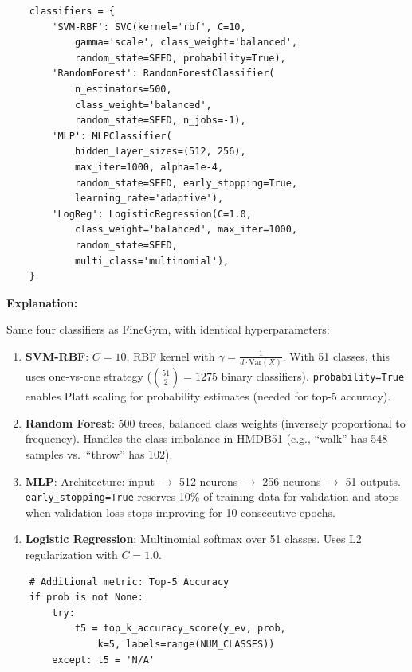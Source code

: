 \documentclass[a4paper, 12pt]{article}
\newenvironment{explanation}{%
  \par\smallskip
  \noindent\textcolor{blue!70!black}{\textbf{Explanation:}}\\
  \noindent
}{\par\medskip}
\begin{document}
\begin{lstlisting}
    classifiers = {
        'SVM-RBF': SVC(kernel='rbf', C=10,
            gamma='scale', class_weight='balanced',
            random_state=SEED, probability=True),
        'RandomForest': RandomForestClassifier(
            n_estimators=500,
            class_weight='balanced',
            random_state=SEED, n_jobs=-1),
        'MLP': MLPClassifier(
            hidden_layer_sizes=(512, 256),
            max_iter=1000, alpha=1e-4,
            random_state=SEED, early_stopping=True,
            learning_rate='adaptive'),
        'LogReg': LogisticRegression(C=1.0,
            class_weight='balanced', max_iter=1000,
            random_state=SEED,
            multi_class='multinomial'),
    }
\end{lstlisting}

\begin{explanation}
Same four classifiers as FineGym, with identical hyperparameters:

\begin{enumerate}[nosep]
  \item \textbf{SVM-RBF}: $C=10$, RBF kernel with $\gamma = \frac{1}{d \cdot \text{Var}(X)}$. With 51 classes, this uses one-vs-one strategy ($\binom{51}{2} = 1275$ binary classifiers). \texttt{probability=True} enables Platt scaling for probability estimates (needed for top-5 accuracy).

  \item \textbf{Random Forest}: 500 trees, balanced class weights (inversely proportional to frequency). Handles the class imbalance in HMDB51 (e.g., ``walk'' has 548 samples vs.\ ``throw'' has 102).

  \item \textbf{MLP}: Architecture: input $\to$ 512 neurons $\to$ 256 neurons $\to$ 51 outputs. \texttt{early\_stopping=True} reserves 10\% of training data for validation and stops when validation loss stops improving for 10 consecutive epochs.

  \item \textbf{Logistic Regression}: Multinomial softmax over 51 classes. Uses L2 regularization with $C=1.0$.
\end{enumerate}
\end{explanation}

\begin{lstlisting}
    # Additional metric: Top-5 Accuracy
    if prob is not None:
        try:
            t5 = top_k_accuracy_score(y_ev, prob,
                k=5, labels=range(NUM_CLASSES))
        except: t5 = 'N/A'
\end{lstlisting}
\end{document}
